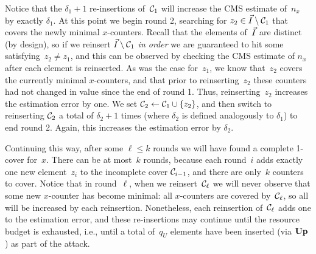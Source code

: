 Notice that the $\delta_1+1$ re-insertions of~$\mathcal{C}_1$ will increase the CMS estimate of~$n_x$ by exactly $\delta_1$. At this point we begin round 2, searching for $z_2 \in \vec{I}\setminus\mathcal{C}_1$ that covers the newly minimal $x$-counters.  Recall that the elements of~$\vec{I}$ are distinct (by design), so if we reinsert $\vec{I}\setminus\mathcal{C}_1$ \emph{in order} we are guaranteed to hit some satisfying~$z_2 \neq z_1$, and this can be observed by checking the CMS estimate of $n_x$ after each element is reinserted.  As was the case for~$z_1$, we know that~$z_2$ covers the currently minimal $x$-counters, and that prior to reinserting~$z_2$ these counters had not changed in value since the end of round 1.  Thus, reinserting~$z_2$ increases the estimation error by one.  We set $\mathcal{C}_2 \gets \mathcal{C}_1 \cup \{z_2\}$, and then switch to reinserting $\mathcal{C}_2$ a total of $\delta_2+1$ times (where $\delta_2$ is defined analogously to $\delta_1$) to end round 2.  Again, this increases the estimation error by $\delta_2$.

Continuing this way, after some $\ell \leq k$ rounds we will have found a complete 1-cover for~$x$.  There can be at most~$k$ rounds, because each round~$i$ adds exactly one new element~$z_i$ to the incomplete cover $\mathcal{C}_{i-1}$, and there are only~$k$ counters to cover.  Notice that in round~$\ell$, when we reinsert~$\mathcal{C}_\ell$ we will never observe that some new $x$-counter has become minimal: all $x$-counters are covered by~$\mathcal{C}_\ell$, so all will be increased by each reinsertion.  Nonetheless, each reinsertion of~$\mathcal{C}_\ell$ adds one to the estimation error, and these re-insertions may continue until the resource budget is exhausted, i.e., until a total of~$q_U$ elements have been inserted (via $\textup{\textbf{Up}}\hspace{0.5pt}$) as part of the attack.

